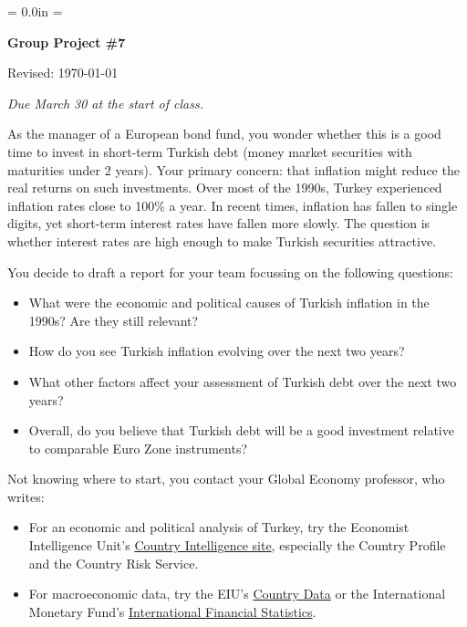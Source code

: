 \documentclass[letterpaper,12pt]{article}
\def\HeadName{Group Project \#7}
\begin{document}
\parindent = 0.0in
\parskip = \bigskipamount
\thispagestyle{empty}%
\Head

\centerline{\large \bf \HeadName}%
\centerline{Revised:  \today}

\medskip
{\it Due March 30 at the start of class. }
\medskip

As the manager of a European bond fund, 
you wonder whether this is a good time to invest in short-term 
Turkish debt (money market securities with maturities under 2 years).  
Your primary concern:  that inflation might reduce the real returns 
on such investments.  
Over most of the 1990s, 
Turkey experienced inflation rates close to 100\% a year.  
In recent times, 
inflation has fallen to single digits, 
yet short-term interest rates have fallen more slowly.  
The question is whether interest rates are high enough to make Turkish 
securities attractive.  

You decide to draft a report for your team focussing on the following
 questions:  
%
\begin{itemize}

\item What were the economic and political 
causes of Turkish inflation in the 1990s? Are they still relevant?

\item How do you see Turkish inflation evolving over the next two years?  

\item What other factors affect your assessment of Turkish debt over the 
next two years?

\item Overall, do you believe that Turkish debt will be a good investment relative to comparable Euro Zone instruments?  

\end{itemize}
%
Not knowing where to start, you contact your Global Economy professor, 
who writes:
\begin{itemize}

\item For an economic and political analysis of Turkey, try the Economist Intelligence Unit's
\href{http://db.eiu.com/index.asp?layout=publicationTypes}{Country Intelligence site}, especially
the Country Profile and the Country Risk Service.


\item For macroeconomic data, try the EIU's
\href{http://www.countrydata.bvdep.com/cgi/template.dll?product=101&user=ipaddress}{Country Data}
or the International Monetary Fund's
\href{http://ifs.apdi.net/imf/ifsbrowser.aspx?branch=ROOT}{International Financial Statistics}.

\end{itemize}
\end{document}
